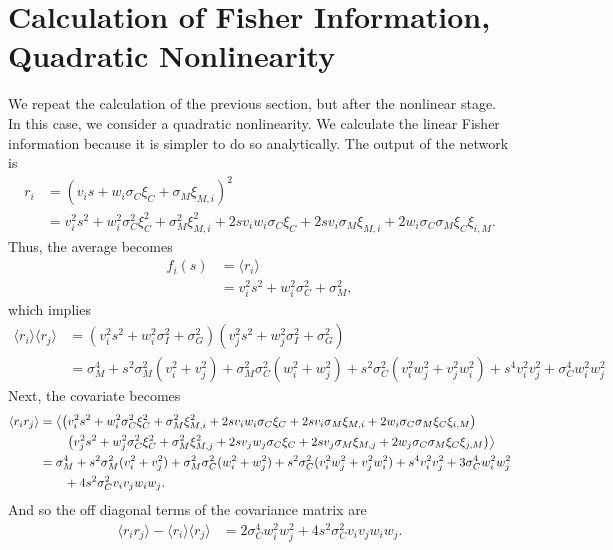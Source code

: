 \documentclass[11pt]{article}
\begin{document}
	\section{Calculation of Fisher Information, Quadratic Nonlinearity}
	We repeat the calculation of the previous section, but after the nonlinear stage. In this case, we consider a quadratic nonlinearity. We calculate the linear Fisher information because it is simpler to do so analytically. The output of the network is 
	\begin{align}
	r_i &= (v_i s + w_i \sigma_C \xi_C + \sigma_M \xi_{M,i})^2 \\
	&= v_i^2 s^2 + w_i^2 \sigma_C^2 \xi_C^2 +  \sigma_M^2 \xi_{M,i}^2 + 2s v_i w_i \sigma_C \xi_C + 2 sv_i  \sigma_M \xi_{M,i} + 2w_i \sigma_C \sigma_M \xi_{C} \xi_{i,M}.
	\end{align}
	Thus, the average becomes 
	\begin{align}
	f_i(s) &= \langle r_i \rangle \\
	&= v_i^2 s^2 + w_i^2 \sigma_C^2 + \sigma_M^2,
	\end{align}
	which implies 
	\begin{align}
	\langle r_i \rangle  \langle r_j \rangle &= (v_i^2 s^2 + w_i^2 \sigma_I^2 + \sigma_G^2)(v_j^2 s^2 + w_j^2 \sigma_I^2 + \sigma_G^2)\\
	&= \sigma_M^4 + s^2 \sigma_M^2 (v_i^2 + v_j^2)  + \sigma_M^2 \sigma_C^2 (w_i^2 + w_j^2) + s^2 \sigma_C^2 (v_i^2 w_j^2 + v_j^2 w_i^2) + s^4 v_i^2 v_j^2+ \sigma_C^4 w_i^2 w_j^2
	\end{align}
	Next, the covariate becomes 
	\begin{align}
	\langle r_i r_j \rangle &= \left\langle \left(v_i^2 s^2 + w_i^2 \sigma_C^2 \xi_C^2 +  \sigma_M^2 \xi_{M,i}^2 + 2s v_i w_i \sigma_C \xi_C + 2 sv_i  \sigma_M \xi_{M,i} + 2w_i \sigma_C \sigma_M \xi_{C} \xi_{i,M}\right) \right. \notag \\
	& \qquad \left. \left(v_j^2 s^2 + w_j^2 \sigma_C^2 \xi_C^2 +  \sigma_M^2 \xi_{M,j}^2 + 2s v_j w_j \sigma_C \xi_C + 2 sv_j  \sigma_M \xi_{M,j} + 2w_j \sigma_C \sigma_M \xi_{C} \xi_{j,M}\right)\right\rangle \\
	&= \sigma_M^4 + s^2 \sigma_M^2 (v_i^2 + v_j^2) + \sigma_M^2 \sigma_C^2 (w_i^2 + w_j^2) + s^2 \sigma_C^2 (v_i^2 w_j^2 + v_j^2 w_i^2) + s^4 v_i^2 v_j^2 + 3\sigma_C^4 w_i^2 w_j^2 \notag \\
	& \qquad + 4s^2 \sigma_C^2 v_i v_j w_i w_j.
	\end{align}
	And so the off diagonal terms of the covariance matrix are 
	\begin{align}
	\langle r_i r_j \rangle - \langle r_i \rangle \langle r_j \rangle &= 2 \sigma_C^4 w_i^2 w_j^2 + 4s^2 \sigma_C^2 v_i v_j w_i w_j.
	\end{align}
\end{document}
